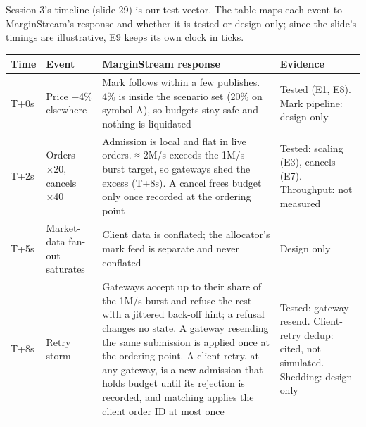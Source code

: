 \documentclass[10pt,a4paper]{article}
\newcounter{none}  %
\begin{document}
Session 3's timeline (slide 29) is our test vector. The table maps each event to
MarginStream's response and whether it is tested or design only; since the
slide's timings are illustrative, E9 keeps its own clock in ticks.

{\def\LTcaptype{none} %
\begin{longtable}[]{@{}
  >{\raggedright\arraybackslash}p{}
  >{\raggedright\arraybackslash}p{}
  >{\raggedright\arraybackslash}p{}
  >{\raggedright\arraybackslash}p{}@{}}
\toprule\noalign{}
\begin{minipage}[b]{\linewidth}\raggedright
Time
\end{minipage} & \begin{minipage}[b]{\linewidth}\raggedright
Event
\end{minipage} & \begin{minipage}[b]{\linewidth}\raggedright
MarginStream response
\end{minipage} & \begin{minipage}[b]{\linewidth}\raggedright
Evidence
\end{minipage} \\
\midrule\noalign{}
\endhead
\bottomrule\noalign{}
\endlastfoot
T+0s & Price −4\% elsewhere & Mark follows within a few publishes. 4\% is inside the scenario set (20\% on symbol A), so budgets stay safe and nothing is liquidated & Tested (E1, E8). Mark pipeline: design only \\
T+2s & Orders ×20, cancels ×40 & Admission is local and flat in live orders. ≈ 2M/s exceeds the 1M/s burst target, so gateways shed the excess (T+8s). A cancel frees budget only once recorded at the ordering point & Tested: scaling (E3), cancels (E7). Throughput: not measured \\
T+5s & Market-data fan-out saturates & Client data is conflated; the allocator's mark feed is separate and never conflated & Design only \\
T+8s & Retry storm & Gateways accept up to their share of the 1M/s burst and refuse the rest with a jittered back-off hint; a refusal changes no state. A gateway resending the same submission is applied once at the ordering point. A client retry, at any gateway, is a new admission that holds budget until its rejection is recorded, and matching applies the client order ID at most once & Tested: gateway resend. Client-retry dedup: cited, not simulated. Shedding: design only \\

\end{longtable}}
\end{document}
